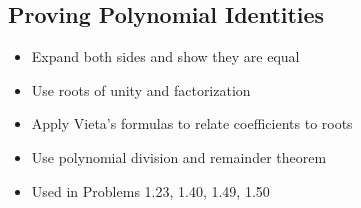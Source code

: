 \subsection*{Proving Polynomial Identities}
\begin{itemize}
\item Expand both sides and show they are equal
\item Use roots of unity and factorization
\item Apply Vieta's formulas to relate coefficients to roots
\item Use polynomial division and remainder theorem
\item Used in Problems 1.23, 1.40, 1.49, 1.50
\end{itemize}
